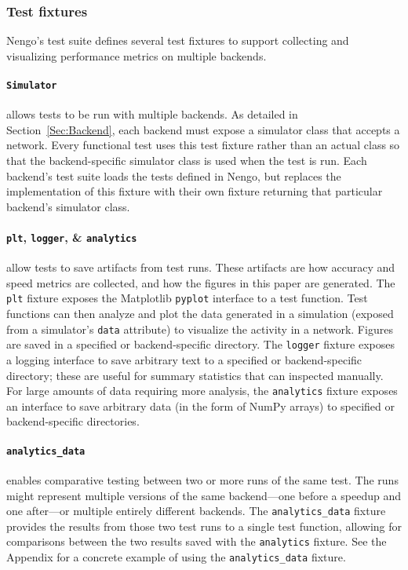 \documentclass{frontiersSCNS}
\begin{document}
\subsubsection{Test fixtures}

Nengo's test suite defines several test fixtures
to support collecting and visualizing performance metrics
on multiple backends.

\paragraph{\texttt{Simulator}}
allows tests to be run with multiple backends.
As detailed in Section~\ref{Sec:Backend},
each backend must expose a simulator class
that accepts a network.
Every functional test uses this test fixture rather than
an actual class so that
the backend-specific simulator class is used
when the test is run.
Each backend's test suite loads
the tests defined in Nengo,
but replaces the implementation of
this fixture with their own fixture
returning that particular backend's simulator class.

\paragraph{\texttt{plt}, \texttt{logger}, \& \texttt{analytics}}
allow tests to save artifacts from test runs.
These artifacts are how accuracy and speed metrics
are collected, and how the figures
in this paper are generated.
The \texttt{plt} fixture exposes the Matplotlib \citep{hunter2007}
\texttt{pyplot} interface to a test function.
Test functions can then analyze and plot
the data generated in a simulation
(exposed from a simulator's \texttt{data} attribute)
to visualize the activity in a network.
Figures are saved in a specified or backend-specific directory.
The \texttt{logger} fixture exposes a logging interface
to save arbitrary text to a specified
or backend-specific directory;
these are useful for summary statistics
that can inspected manually.
For large amounts of data
requiring more analysis,
the \texttt{analytics} fixture exposes an interface
to save arbitrary data (in the form of NumPy arrays)
to specified or backend-specific directories.

\paragraph{\texttt{analytics\_data}}
enables comparative testing between
two or more runs of the same test.
The runs might represent multiple versions
of the same backend---one before a
speedup and one after---or multiple
entirely different backends.
The \texttt{analytics\_data} fixture
provides the results from those two
test runs to a single test function,
allowing for comparisons
between the two results saved
with the \texttt{analytics} fixture.
See the Appendix for a
concrete example of using the
\texttt{analytics\_data} fixture.
\end{document}
